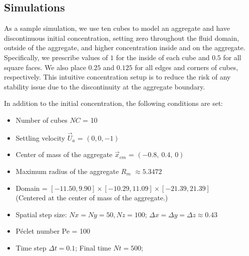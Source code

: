 \subsection{Simulations}
\label{sec:ch2_CO2_simulation}
As a sample simulation, we use ten cubes to model an aggregate and have discontinuous initial concentration, setting zero throughout the fluid domain, outside of the aggregate, and higher concentration inside and on the aggregate. Specifically, we prescribe values of $1$ for the inside of each cube and $0.5$ for all square faces. We also place $0.25$ and $0.125$ for all edges and corners of cubes, respectively. 
This intuitive concentration setup is to reduce the risk of any stability issue due to the discontinuity at the aggregate boundary. 

In addition to the initial concentration, the following conditions are set:
\begin{framed}
\begin{itemize}
	\item Number of cubes $NC$ = 10
	\item Settling velocity $\vec{U}_a$ = $(0,0,-1)$
	\item Center of mass of the aggregate $\vec{x}_{cm}$ = $(-0.8, \  0.4, \ 0)$
	\item Maximum radius of the aggregate $R_m$ $\approx 5.3472$
	\item Domain = $[-11.50, 9.90] \times [-10.29, 11.09] \times [-21.39, 21.39]$\\
	(Centered at the center of mass of the aggregate.)
	\item Spatial step size: $Nx = Ny = 50, Nz = 100$; $\Delta x = \Delta y = \Delta z \approx 0.43$
	\item Péclet number Pe = 100
	\item Time step $\Delta t = 0.1$; Final time $Nt = 500$; 
\end{itemize}
\end{framed}

